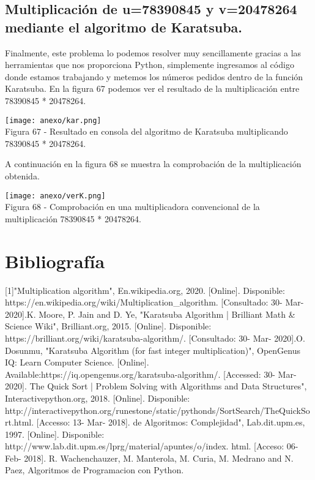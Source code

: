\documentclass[12pt,twoside]{article}
\begin{document}
\subsection{Multiplicación de u=78390845 y v=20478264 mediante el algoritmo de Karatsuba.}
Finalmente, este problema lo podemos resolver muy sencillamente gracias a las herramientas que nos proporciona Python, simplemente ingresamos al código donde estamos trabajando y metemos los números pedidos dentro de la función Karatsuba. En la figura 67 podemos ver el resultado de la multiplicación entre 78390845 * 20478264.
\begin{center}
    \texttt{[image: anexo/kar.png]}\\
    Figura 67 - Resultado en consola del algoritmo de Karatsuba multiplicando 78390845 * 20478264.
\end{center}
A continuación en la figura 68 se muestra la comprobación de la multiplicación obtenida.
\begin{center}
    \texttt{[image: anexo/verK.png]}\\
    Figura 68 - Comprobación en una multiplicadora convencional de la multiplicación 78390845 * 20478264.
\end{center}
\section{Bibliograf\'ia}
[1]"Multiplication algorithm", En.wikipedia.org, 2020. [Online]. Disponible: https://en.wikipedia.org/wiki/Multiplication\_algorithm. [Consultado: 30- Mar- 2020].\newline
[2]K. Moore, P. Jain and D. Ye, "Karatsuba Algorithm | Brilliant Math & Science Wiki", Brilliant.org, 2015. [Online]. Disponible: https://brilliant.org/wiki/karatsuba-algorithm/. [Consultado: 30- Mar- 2020].\newline
[3]O. Dosunmu, "Karatsuba Algorithm (for fast integer multiplication)", OpenGenus IQ: Learn Computer Science. [Online]. Available:https://iq.opengenus.org/karatsuba-algorithm/. [Accessed: 30- Mar- 2020]. \newline
[4] The Quick Sort | Problem Solving with Algorithms and
Data Structures", Interactivepython.org, 2018. [Online]. Disponible: http://interactivepython.org/runestone/static/pythonds/SortSearch/TheQuickSort.html. [Accesso: 13- Mar- 2018]. \newline
[5] \Analisis de Algoritmos: Complejidad", Lab.dit.upm.es, 1997. [Online]. Disponible: http://www.lab.dit.upm.es/lprg/material/apuntes/o/index.
html. [Acceso: 06- Feb- 2018]. \newline
[6] R. Wachenchauzer, M. Manterola, M. Curia, M. Medrano and N. Paez, Algoritmos de Programacion con Python. \newline
\end{document}
